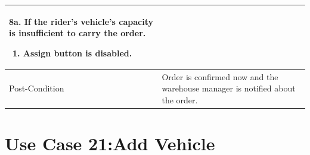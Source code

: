 \documentclass[12pt,a4paper]{article}
\begin{document}
\begin{longtable}{| p{3cm}|p{12cm}|}
8a. If the rider's vehicle's capacity is insufficient to carry the order.

 	\begin{enumerate}

		\item Assign button is disabled.

	\end{enumerate}

\\ \hline

Post-Condition &  Order is confirmed now and the warehouse manager is notified about the order.\\ \hline

\end{longtable}
\section*{Use Case 21:Add Vehicle}
\end{document}

